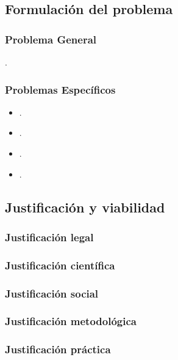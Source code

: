 \documentclass[12pt,a4paper]{article}
\begin{document}
\subsection{Formulación del problema}
\subsubsection{Problema General}
\problema.
\subsubsection{Problemas Específicos}
\begin{itemize}
	\item \problemae.
	\item \problemaee.
	\item \problemaeee.
	\item \problemaeeee.
\end{itemize}


\subsection{Justificación y viabilidad}

\subsubsection{Justificación legal}

\subsubsection{Justificación científica}

\subsubsection{Justificación social}

\subsubsection{Justificación metodológica}

\subsubsection{Justificación práctica}
\end{document}
